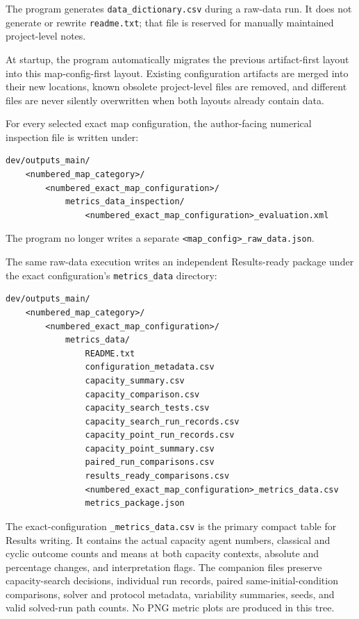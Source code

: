 \documentclass[11pt]{article}
\begin{document}
The program generates \texttt{data\_dictionary.csv} during a raw-data run. It does not generate or rewrite \texttt{readme.txt}; that file is reserved for manually maintained project-level notes.

At startup, the program automatically migrates the previous artifact-first layout into this map-config-first layout. Existing configuration artifacts are merged into their new locations, known obsolete project-level files are removed, and different files are never silently overwritten when both layouts already contain data.

For every selected exact map configuration, the author-facing numerical inspection file is written under:
\begin{lstlisting}
dev/outputs_main/
    <numbered_map_category>/
        <numbered_exact_map_configuration>/
            metrics_data_inspection/
                <numbered_exact_map_configuration>_evaluation.xml
\end{lstlisting}

The program no longer writes a separate \texttt{<map\_config>\_raw\_data.json}.

The same raw-data execution writes an independent Results-ready package under the exact configuration's \texttt{metrics\_data} directory:
\begin{lstlisting}
dev/outputs_main/
    <numbered_map_category>/
        <numbered_exact_map_configuration>/
            metrics_data/
                README.txt
                configuration_metadata.csv
                capacity_summary.csv
                capacity_comparison.csv
                capacity_search_tests.csv
                capacity_search_run_records.csv
                capacity_point_run_records.csv
                capacity_point_summary.csv
                paired_run_comparisons.csv
                results_ready_comparisons.csv
                <numbered_exact_map_configuration>_metrics_data.csv
                metrics_package.json
\end{lstlisting}

The exact-configuration \texttt{\_metrics\_data.csv} is the primary compact table for Results writing. It contains the actual capacity agent numbers, classical and cyclic outcome counts and means at both capacity contexts, absolute and percentage changes, and interpretation flags. The companion files preserve capacity-search decisions, individual run records, paired same-initial-condition comparisons, solver and protocol metadata, variability summaries, seeds, and valid solved-run path counts. No PNG metric plots are produced in this tree.
\end{document}
